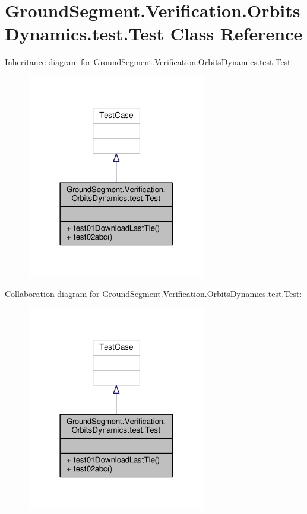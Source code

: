 \hypertarget{class_ground_segment_1_1_verification_1_1_orbits_dynamics_1_1test_1_1_test}{}\section{Ground\+Segment.\+Verification.\+Orbits\+Dynamics.\+test.\+Test Class Reference}
\label{class_ground_segment_1_1_verification_1_1_orbits_dynamics_1_1test_1_1_test}


Inheritance diagram for Ground\+Segment.\+Verification.\+Orbits\+Dynamics.\+test.\+Test\+:\nopagebreak
\begin{figure}[H]
\begin{center}
\leavevmode
\includegraphics[width=222pt]{class_ground_segment_1_1_verification_1_1_orbits_dynamics_1_1test_1_1_test__inherit__graph}
\end{center}
\end{figure}


Collaboration diagram for Ground\+Segment.\+Verification.\+Orbits\+Dynamics.\+test.\+Test\+:\nopagebreak
\begin{figure}[H]
\begin{center}
\leavevmode
\includegraphics[width=222pt]{class_ground_segment_1_1_verification_1_1_orbits_dynamics_1_1test_1_1_test__coll__graph}
\end{center}
\end{figure}

